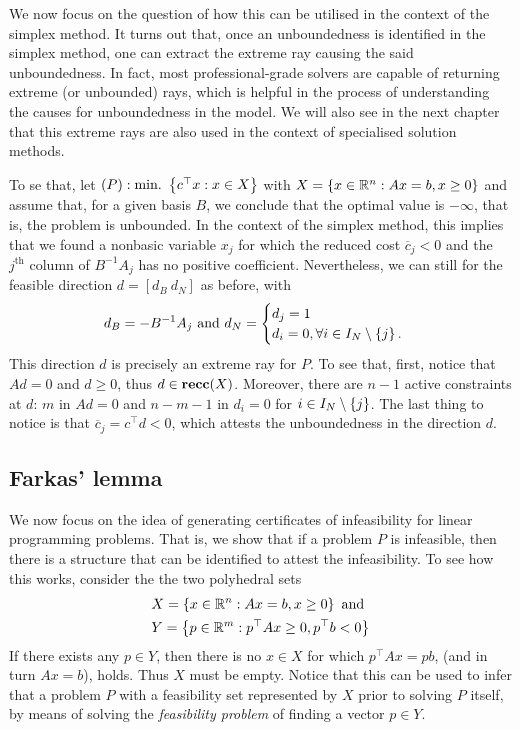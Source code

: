 We now focus on the question of how this can be utilised in the context of the simplex method. It turns out that, once an unboundedness is identified in the simplex method, one can extract the extreme ray causing the said unboundedness. In fact, most professional-grade solvers are capable of returning extreme (or unbounded) rays, which is helpful in the process of understanding  the causes for unboundedness in the model. We will also see in the next chapter that this extreme rays are also used in the context of specialised solution methods.

To se that, let $(P) : \mathop{\text{min.~}}\left\{ c^\top x : x \in X \right \}$ with $X = \left\{ x \in \mathbb{R}^n : Ax = b, x \geq 0 \right \}$ and assume that, for a given basis $B$, we conclude that the optimal value is $-\infty$, that is, the problem is unbounded. In the context of the simplex method, this implies that we found a nonbasic variable $x_j$ for which the reduced cost $\overline{c}_j < 0$ and the $j^\text{th}$ column of $B^{-1}A_j$ has no positive coefficient. Nevertheless, we can still for the feasible direction $d= [d_B ~ d_N]$ as before, with
%
\begin{equation*}
	d_B = -B^{-1}A_j \text{ and } 
	d_N = \begin{cases}
 		d_j = 1 \\
 		d_i = 0, \forall i \in I_N \setminus \left\{ j \right \}.
 	\end{cases}
\end{equation*}
%
This direction $d$ is precisely an extreme ray for $P$. To see that, first, notice that $Ad = 0$ and $d \geq 0$, thus	$d \in {\bf recc}(X)$. Moreover, there are $n-1$ active constraints at $d$: $m$ in $Ad = 0$ and $n-m-1$ in $d_i = 0$ for $i \in I_N \setminus \left\{ j \right \}$. The last thing to notice is that $\overline{c}_j = c^\top d < 0$, which attests the unboundedness in the direction $d$. 

 

\subsection{Farkas' lemma}

We now focus on the idea of generating certificates of infeasibility for linear programming problems. That is, we show that if a problem $P$ is infeasible, then there is a structure that can be identified to attest the infeasibility. To see how this works, consider the the two polyhedral sets
%
\begin{align*}
	&X = \left\{ x \in \mathbb{R}^n : Ax = b,  x \geq 0 \right \} \text{ and } \\ 
	&Y = \left\{ p \in \mathbb{R}^m : p^\top A x \geq 0, p^\top b < 0 \right \}
\end{align*}
%
If there exists any $p \in Y$, then there is no $x \in X$ for which $p^\top Ax = pb$, (and in turn $Ax = b$), holds. Thus $X$ must be empty. Notice that this can be used to infer that a problem $P$ with a feasibility set represented by $X$ prior to solving $P$ itself, by means of solving the \emph{feasibility problem} of finding a vector $p \in Y$. 

